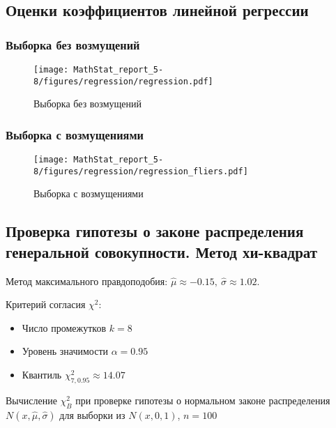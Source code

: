 \documentclass[12pt]{article}
\begin{document}
	\subsection{Оценки коэффициентов линейной регрессии}
	
	\subsubsection{Выборка без возмущений}
	
	\begin{figure}[H]
		\centering
		\texttt{[image: MathStat\_report\_5-8/figures/regression/regression.pdf]}
		\caption{Выборка без возмущений}
	\end{figure}
	
	\subsubsection{Выборка с возмущениями}
	
	\begin{figure}[H]
		\centering
		\texttt{[image: MathStat\_report\_5-8/figures/regression/regression\_fliers.pdf]}
		\caption{Выборка с возмущениями}
	\end{figure}
	
	\subsection{Проверка гипотезы о законе распределения генеральной совокупности. Метод хи-квадрат}
	
	Метод максимального правдоподобия: $\widehat{\mu} \approx -0.15,\ \widehat{\sigma} \approx 1.02$.
	
	Критерий согласия $\chi^2$:
	\begin{itemize}
		\item Число промежутков $k=8$
		\item Уровень значимости $\alpha = 0.95$
		\item Квантиль $\chi^2_{7,0.95}\approx14.07$
	\end{itemize}
	
	\begin{table}[H]
		\centering
		
		\caption{Вычисление $\chi^2_B$ при проверке гипотезы о нормальном законе распределения $N(x, \widehat{\mu}, \widehat{\sigma})$ для выборки из $N(x, 0, 1)$, $n = 100$}
	\end{table}
	
\end{document}
